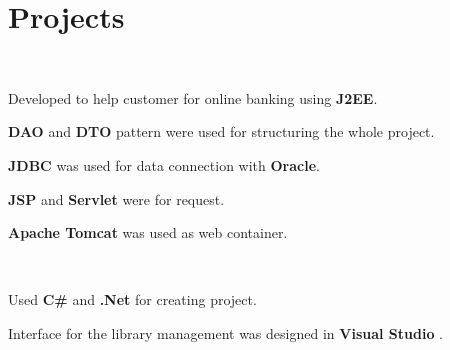 \documentclass[]{deedy-resume-openfont}
\begin{document}
\begin{minipage}[t]{0.33\textwidth}
%
%

\end{minipage} 
\hfill
\begin{minipage}[t]{0.66\textwidth} 





\section{Projects}

\\
\sectionsep
\begin{tightemize}
\item Developed to help customer for online banking using \textbf{J2EE}.
\item \textbf{DAO} and \textbf{DTO} pattern were used for structuring the whole project.
\item \textbf{JDBC} was used for data connection with  \textbf{Oracle}.
\item \textbf{JSP} and \textbf{Servlet} were for request.
\item \textbf{Apache Tomcat} was used as web container.
\end{tightemize}
\sectionsep

\\
\begin{tightemize}
\item Used \textbf{C#} and \textbf{.Net} for creating project.
\item Interface for the library management was designed in \textbf{Visual Studio }. 
\end{tightemize}
\sectionsep







\end{minipage}
\end{document}
